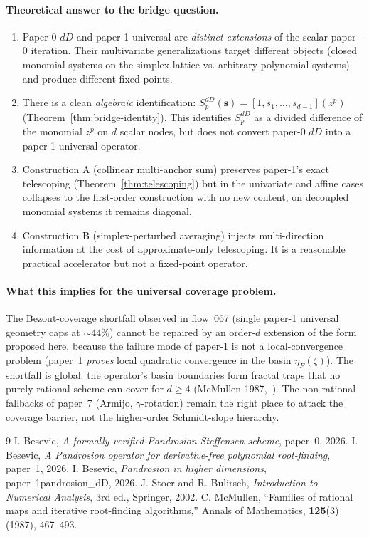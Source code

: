 \documentclass[11pt,a4paper]{article}
\theoremstyle{definition}
\theoremstyle{remark}
\newcommand{\sbf}{\mathbf{s}}
\begin{document}
\paragraph{Theoretical answer to the bridge question.}
\begin{enumerate}
\item Paper-0 $dD$ and paper-1 universal are \emph{distinct extensions} of
  the scalar paper-0 iteration. Their multivariate generalizations target
  different objects (closed monomial systems on the simplex lattice vs.
  arbitrary polynomial systems) and produce different fixed points.
\item There is a clean \emph{algebraic} identification:
  $S_p^{dD}(\sbf) = [1, s_1, \dots, s_{d-1}](z^p)$
  (Theorem~\ref{thm:bridge-identity}). This identifies $S_p^{dD}$ as a
  divided difference of the monomial $z^p$ on $d$ scalar nodes, but does
  not convert paper-0 $dD$ into a paper-1-universal operator.
\item Construction A (collinear multi-anchor sum) preserves paper-1's exact
  telescoping (Theorem~\ref{thm:telescoping}) but in the univariate and
  affine cases collapses to the first-order construction with no new content;
  on decoupled monomial systems it remains diagonal.
\item Construction B (simplex-perturbed averaging) injects multi-direction
  information at the cost of approximate-only telescoping. It is a
  reasonable practical accelerator but not a fixed-point operator.
\end{enumerate}

\paragraph{What this implies for the universal coverage problem.}
The Bezout-coverage shortfall observed in flow~067 (single paper-1 universal
geometry caps at $\sim 44\%$) cannot be repaired by an order-$d$ extension
of the form proposed here, because the failure mode of paper-1 is not a
local-convergence problem (paper~1 \emph{proves} local quadratic convergence
in the basin $\eta_F(\zeta)$). The shortfall is global: the operator's basin
boundaries form fractal traps that no purely-rational scheme can cover for
$d \ge 4$ (McMullen 1987,~\cite{mcmullen}). The non-rational fallbacks of
paper~7 (Armijo, $\gamma$-rotation) remain the right place to attack the
coverage barrier, not the higher-order Schmidt-slope hierarchy.

\begin{thebibliography}{9}
 I. Besevic, \emph{A formally verified Pandrosion-Steffensen scheme}, paper~0, 2026.
 I. Besevic, \emph{A Pandrosion operator for derivative-free polynomial root-finding}, paper~1, 2026.
 I. Besevic, \emph{Pandrosion in higher dimensions}, paper~1pandrosion\_dD, 2026.
 J. Stoer and R. Bulirsch, \emph{Introduction to Numerical Analysis}, 3rd ed., Springer, 2002.
 C. McMullen, ``Families of rational maps and iterative root-finding algorithms,'' Annals of Mathematics, \textbf{125}(3) (1987), 467--493.
\end{thebibliography}
\end{document}
